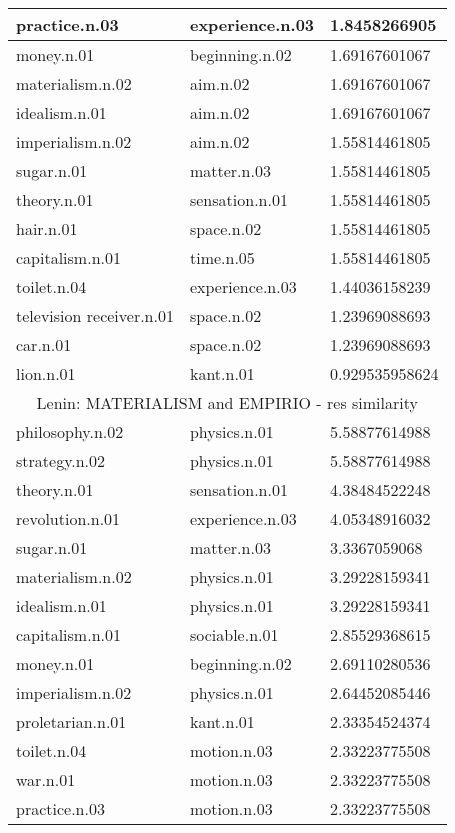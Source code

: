 \begin{center}
\begin{tabular}{ | l | l | l |}
practice.n.03 & experience.n.03 & 1.8458266905 \\ \hline
money.n.01 & beginning.n.02 & 1.69167601067 \\ \hline
materialism.n.02 & aim.n.02 & 1.69167601067 \\ \hline
idealism.n.01 & aim.n.02 & 1.69167601067 \\ \hline
imperialism.n.02 & aim.n.02 & 1.55814461805 \\ \hline
sugar.n.01 & matter.n.03 & 1.55814461805 \\ \hline
theory.n.01 & sensation.n.01 & 1.55814461805 \\ \hline
hair.n.01 & space.n.02 & 1.55814461805 \\ \hline
capitalism.n.01 & time.n.05 & 1.55814461805 \\ \hline
toilet.n.04 & experience.n.03 & 1.44036158239 \\ \hline
television receiver.n.01 & space.n.02 & 1.23969088693 \\ \hline
car.n.01 & space.n.02 & 1.23969088693 \\ \hline
lion.n.01 & kant.n.01 & 0.929535958624 \\ \hline
\multicolumn{3}{|c|}{Lenin: MATERIALISM and EMPIRIO - res similarity} \\ \hline
philosophy.n.02 & physics.n.01 & 5.58877614988 \\ \hline
strategy.n.02 & physics.n.01 & 5.58877614988 \\ \hline
theory.n.01 & sensation.n.01 & 4.38484522248 \\ \hline
revolution.n.01 & experience.n.03 & 4.05348916032 \\ \hline
sugar.n.01 & matter.n.03 & 3.3367059068 \\ \hline
materialism.n.02 & physics.n.01 & 3.29228159341 \\ \hline
idealism.n.01 & physics.n.01 & 3.29228159341 \\ \hline
capitalism.n.01 & sociable.n.01 & 2.85529368615 \\ \hline
money.n.01 & beginning.n.02 & 2.69110280536 \\ \hline
imperialism.n.02 & physics.n.01 & 2.64452085446 \\ \hline
proletarian.n.01 & kant.n.01 & 2.33354524374 \\ \hline
toilet.n.04 & motion.n.03 & 2.33223775508 \\ \hline
war.n.01 & motion.n.03 & 2.33223775508 \\ \hline
practice.n.03 & motion.n.03 & 2.33223775508 \\ \hline

\end{tabular}
\end{center}
